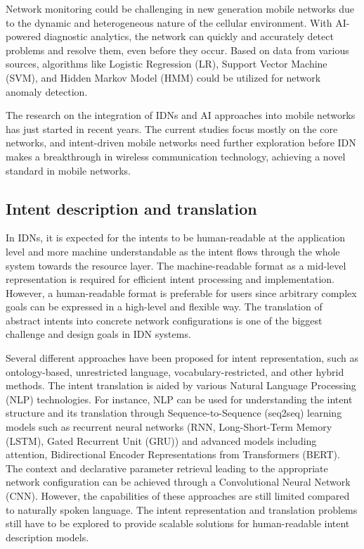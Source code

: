 Network monitoring could be challenging in new generation mobile networks due to the dynamic and heterogeneous nature of the cellular environment. With AI-powered diagnostic analytics, the network can quickly and accurately detect problems and resolve them, even before they occur. Based on data from various sources, algorithms like Logistic Regression (LR), Support Vector Machine (SVM), and Hidden Markov Model (HMM) could be utilized for network anomaly detection.\cite{anuradha2017empowering}

The research on the integration of IDNs and AI approaches into mobile networks has just started in recent years. The current studies focus mostly on the core networks, and intent-driven mobile networks need further exploration before IDN makes a breakthrough in wireless communication technology, achieving a novel standard in mobile networks.


\subsection{Intent description and translation}
In IDNs, it is expected for the intents to be human-readable at the application level and more machine understandable as the intent flows through the whole system towards the resource layer. The machine-readable format as a mid-level representation is required for efficient intent processing and implementation. However, a human-readable format is preferable for users since arbitrary complex goals can be expressed in a high-level and flexible way. The translation of abstract intents into concrete network configurations is one of the biggest challenge and design goals in IDN systems.

Several different approaches have been proposed for intent representation, such as ontology-based, unrestricted language, vocabulary-restricted, and other hybrid methods. The intent translation is aided by various Natural Language Processing (NLP) technologies. For instance, NLP  can be used for understanding the intent structure and its translation through Sequence-to-Sequence (seq2seq) learning models such as recurrent neural networks (RNN, Long-Short-Term Memory (LSTM), Gated Recurrent Unit (GRU)) and advanced models including attention, Bidirectional Encoder Representations from Transformers (BERT). The context and declarative parameter retrieval leading to the appropriate network configuration can be achieved through a Convolutional Neural Network (CNN). However, the capabilities of these approaches are still limited compared to naturally spoken language. The intent representation and translation problems still have to be explored to provide scalable solutions for human-readable intent description models.\cite[18]{Mehmood2021} 


